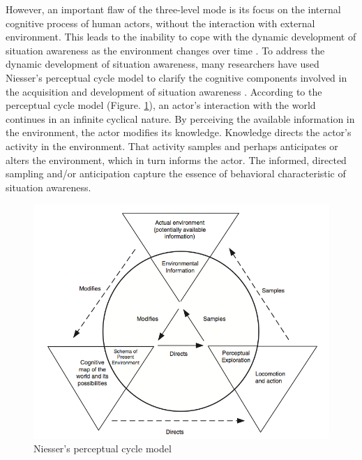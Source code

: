 However, an important flaw of the three-level mode is its focus on the internal cognitive process of human actors, without the interaction with external environment. This leads to the inability to cope with the dynamic development of situation awareness as the environment changes over time \cite{Smith1995,uhlarik2002review}. To address the dynamic development of situation awareness, many researchers have used Niesser's perceptual cycle model \cite{neisser1976cognition} to clarify the cognitive components involved in the acquisition and development of situation awareness \cite{Smith1995,Adams1995,Gutwin2002,Stanton2009}. According to the perceptual cycle model (Figure. \ref{fig:perceptual_cycle}), an actor's interaction with the world continues in an infinite cyclical nature. By perceiving the available information in the environment, the actor modifies its knowledge. Knowledge directs the actor's activity in the environment. That activity samples and perhaps anticipates or alters the environment, which in turn informs the actor. The informed, directed sampling and/or anticipation capture the essence of behavioral characteristic of situation awareness.

\begin{figure}[htbp] %
   \centering
   \includegraphics[width=4.5in]{perceptual_cycle.jpg} 
   \caption{Niesser's perceptual cycle model \cite{Salmon2008}}
   \label{fig:perceptual_cycle}
\end{figure}

